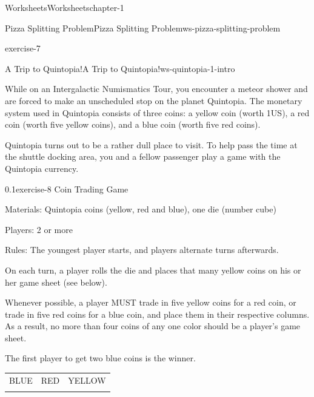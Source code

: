 \documentclass[twoside,11pt,]{book}
\begin{document}
\begin{chapterptx}{Worksheets}{}{Worksheets}{}{}{chapter-1}
\begin{worksheet-section-numberless}{Pizza Splitting Problem}{}{Pizza Splitting Problem}{}{}{ws-pizza-splitting-problem}
\begin{divisionexercise}{7}{}{}{exercise-7}
\end{divisionexercise}%
\end{worksheet-section-numberless}
\restoregeometry
%
%
\typeout{************************************************}
\typeout{************************************************}
%
\begin{worksheet-section-numberless}{A Trip to Quintopia!}{}{A Trip to Quintopia!}{}{}{ws-quintopia-1-intro}
\begin{introduction}{}%
\hypertarget{p-10}{}%
While on an Intergalactic Numismatics Tour, you encounter a meteor shower and are forced to make an unscheduled stop on the planet Quintopia.  The monetary system used in Quintopia consists of three coins:  a yellow coin (worth \textdollar{}1US), a red coin (worth five yellow coins), and a blue coin (worth five red coins).%
\par
\hypertarget{p-11}{}%
Quintopia turns out to be a rather dull place to visit.  To help pass the time at the shuttle docking area, you and a fellow passenger play a game with the Quintopia currency.%
\end{introduction}%
\begin{divisionexercise}{1}{}{0.1}{exercise-8}%
\hypertarget{p-12}{}%
Coin Trading Game%
\par
\hypertarget{p-13}{}%
Materials:  Quintopia coins (yellow, red and blue), one die (number cube)%
\par
\hypertarget{p-14}{}%
Players:  2 or more%
\par
\hypertarget{p-15}{}%
Rules:  The youngest player starts, and players alternate turns afterwards.%
\par
\hypertarget{p-16}{}%
On each turn, a player rolls the die and places that many yellow coins on his or her game sheet (see below).%
\par
\hypertarget{p-17}{}%
Whenever possible, a player MUST trade in five yellow coins for a red coin, or trade in five red coins for a blue coin, and place them in their respective columns.  As a result, no more than four coins of any one color should be a player’s game sheet.%
\par
\hypertarget{p-18}{}%
The first player to get two blue coins is the winner.%
\begin{table}
\centering
\begin{tabular}{lll}
BLUE&RED&YELLOW\tabularnewline[0pt]
&&
\end{tabular}
\end{table}

\end{divisionexercise}
\end{worksheet-section-numberless}
\end{chapterptx}
\end{document}
